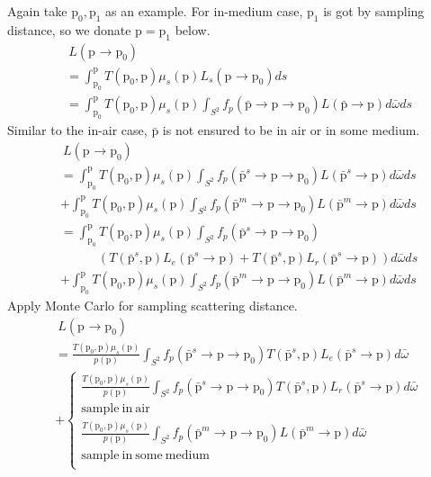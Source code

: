 \documentclass[acmtog]{acmart}
\def\w{\omega}
\def\p{\mathrm{p}}
\def\pp#1#2{\p_{#1}\rightarrow\p_{#2}}
\begin{document}
Again take $\p_0,\p_1$ as an example.
For in-medium case, $\p_1$ is got by sampling distance, so we donate $\p=\p_1$ below.
\begin{equation} \label{eq11}
	\begin{split}
		&\ L(\pp{}{0})\\
		&= \int_{\p_0}^{\p}T(\p_0,\p)\mu_s(\p)L_s(\pp{}{0})ds\\
		&= \int_{\p_0}^{\p}T(\p_0,\p)\mu_s(\p)\int_{S^2}f_p(\bar{\p}\rightarrow\p\rightarrow\p_0)L(\bar{\p}\rightarrow\p)d\bar{\w}ds
	\end{split}
\end{equation}
Similar to the in-air case, $\bar{\p}$ is not ensured to be in air or in some medium.
\begin{equation} \label{eq12}
	\begin{split}
		&\ L(\pp{}{0})\\
		&= \int_{\p_0}^{\p}T(\p_0,\p)\mu_s(\p)\int_{S^2}f_p(\bar{\p}^s\rightarrow\p\rightarrow\p_0)L(\bar{\p}^s\rightarrow\p)d\bar{\w}ds\\
		&+ \int_{\p_0}^{\p}T(\p_0,\p)\mu_s(\p)\int_{S^2}f_p(\bar{\p}^m\rightarrow\p\rightarrow\p_0)L(\bar{\p}^m\rightarrow\p)d\bar{\w}ds\\
		&= \int_{\p_0}^{\p}T(\p_0,\p)\mu_s(\p)\int_{S^2}f_p(\bar{\p}^s\rightarrow\p\rightarrow\p_0)\\
		&\quad\quad\quad \left(T(\bar{\p}^s,\p)L_e(\bar{\p}^s\rightarrow\p)+T(\bar{\p}^s,\p)L_r(\bar{\p}^s\rightarrow\p)\right)d\bar{\w}ds\\
		&+ \int_{\p_0}^{\p}T(\p_0,\p)\mu_s(\p)\int_{S^2}f_p(\bar{\p}^m\rightarrow\p\rightarrow\p_0)L(\bar{\p}^m\rightarrow\p)d\bar{\w}ds
	\end{split}
\end{equation}
Apply Monte Carlo for sampling scattering distance.
\begin{equation} \label{eq13}
	\begin{split}
		&\ L(\pp{}{0})\\
		&= \frac{T(\p_0,\p)\mu_s(\p)}{p({\p})}\int_{S^2}f_p(\bar{\p}^s\rightarrow\p\rightarrow\p_0)T(\bar{\p}^s,\p)L_e(\bar{\p}^s\rightarrow\p)d\bar{\w}\\
		&+ \left\{\begin{aligned}
			\frac{T(\p_0,\p)\mu_s(\p)}{p({\p})}\int_{S^2}f_p(\bar{\p}^s\rightarrow\p\rightarrow\p_0)T(\bar{\p}^s,\p)L_r(\bar{\p}^s\rightarrow\p)d\bar{\w}\\
			\mathrm{sample\ in\ air}\\
			\frac{T(\p_0,\p)\mu_s(\p)}{p({\p})}\int_{S^2}f_p(\bar{\p}^m\rightarrow\p\rightarrow\p_0)L(\bar{\p}^m\rightarrow\p)d\bar{\w}\quad\quad\quad \\
			\mathrm{sample\ in\ some\ medium}\\
		\end{aligned}\right.
	\end{split}
\end{equation}
\end{document}

